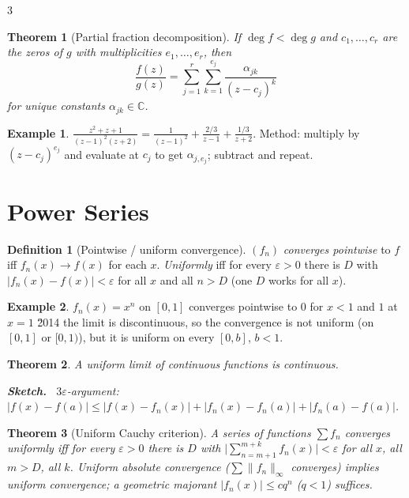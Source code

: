 \documentclass[10pt,a4paper,landscape]{article}
\theoremstyle{definition}
\newtheorem{defn}{Definition}[section]
\newtheorem{exm}{Example}[section]
\theoremstyle{plain}
\newtheorem{thm}{Theorem}[section]
\theoremstyle{remark}
\newcommand{\C}{\mathbb{C}}
\newcommand{\eps}{\varepsilon}
\newcommand{\abs}[1]{\lvert #1 \rvert}
\newcommand{\norm}[1]{\lVert #1 \rVert}
\newcommand{\oo}{\infty}
\newcommand{\degg}{\operatorname{deg}}
\newenvironment{proofsketch}{%
  \par\small\color{exgray}\textbf{Sketch.}\ }%
  {\par}
\begin{document}
\begin{multicols*}{3}
\begin{thm}[Partial fraction decomposition]
If $\degg f < \degg g$ and $c_1,\dots,c_r$ are the zeros of $g$ with multiplicities $e_1,\dots,e_r$, then
\[
\frac{f(z)}{g(z)} = \sum_{j=1}^{r} \sum_{k=1}^{e_j} \frac{\alpha_{jk}}{(z - c_j)^k}
\]
for unique constants $\alpha_{jk} \in \C$.
\end{thm}

\begin{exm}
$\frac{z^2+z+1}{(z-1)^2(z+2)} = \frac{1}{(z-1)^2} + \frac{2/3}{z-1} + \frac{1/3}{z+2}$. Method: multiply by $(z-c_j)^{e_j}$ and evaluate at $c_j$ to get $\alpha_{j,e_j}$; subtract and repeat.
\end{exm}

\section{Power Series}

\begin{defn}[Pointwise / uniform convergence]
$(f_n)$ \emph{converges pointwise} to $f$ iff $f_n(x) \to f(x)$ for each $x$. \emph{Uniformly} iff for every $\eps>0$ there is $D$ with $\abs{f_n(x) - f(x)} < \eps$ for all $x$ and all $n > D$ (one $D$ works for all $x$).
\end{defn}

\begin{exm}
$f_n(x) = x^n$ on $[0,1]$ converges pointwise to $0$ for $x<1$ and $1$ at $x=1$ \u2014 the limit is discontinuous, so the convergence is not uniform (on $[0,1]$ or $[0,1)$), but it is uniform on every $[0,b]$, $b<1$.
\end{exm}

\begin{thm}
A uniform limit of continuous functions is continuous.
\begin{proofsketch}
$3\eps$-argument: $\abs{f(x)-f(a)} \le \abs{f(x)-f_n(x)} + \abs{f_n(x)-f_n(a)} + \abs{f_n(a)-f(a)}$.
\end{proofsketch}
\end{thm}

\begin{thm}[Uniform Cauchy criterion]
A series of functions $\sum f_n$ converges uniformly iff for every $\eps>0$ there is $D$ with $\abs{\sum_{n=m+1}^{m+k} f_n(x)} < \eps$ for all $x$, all $m > D$, all $k$. Uniform absolute convergence ($\sum \norm{f_n}_\oo$ converges) implies uniform convergence; a geometric majorant $\abs{f_n(x)} \le c q^n$ ($q<1$) suffices.
\end{thm}


\end{multicols*}
\end{document}
